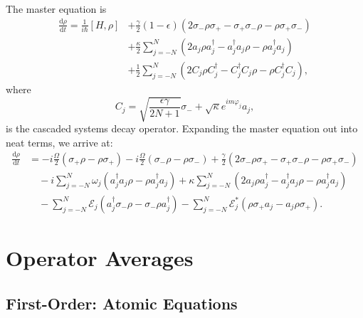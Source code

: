 \documentclass{article}
\newcommand{\ddt}[1][]{\frac{\mathrm{d} #1}{\mathrm{d}t}}
\begin{document}
The master equation is
\begin{align}
	\ddt[\rho] = \frac{1}{i \hbar} [H, \rho] &+ \frac{\gamma}{2} \left(1 - \epsilon\right) \left( 2 \sigma_{-} \rho \sigma_{+} - \sigma_{+} \sigma_{-} \rho - \rho \sigma_{+} \sigma_{-} \right) \nonumber \\
	&+ \frac{\kappa}{2} \sum_{j=-N}^{N} \left( 2 a_{j} \rho a^{\dagger}_{j} - a^{\dagger}_{j} a_{j} \rho - \rho a^{\dagger}_{j} a_{j} \right) \nonumber \\
	&+ \frac{1}{2} \sum_{j=-N}^{N} \left( 2 C_{j} \rho C^{\dagger}_{j} - C^{\dagger}_{j} C_{j} \rho - \rho C^{\dagger}_{j} C_{j} \right),
\end{align}
where
\begin{equation}
	C_{j} = \sqrt{\frac{\epsilon \gamma}{2N + 1}} \sigma_{-} + \sqrt{\kappa} e^{i m \varphi_{j}} a_{j},
\end{equation}
is the cascaded systems decay operator. Expanding the master equation out into neat terms, we arrive at:
\begin{align}
	\ddt[\rho] &= -i \frac{\Omega}{2} \left( \sigma_{+}\rho - \rho \sigma_{+} \right) - i \frac{\Omega}{2} \left( \sigma_{-} \rho - \rho \sigma_{-} \right) + \frac{\gamma}{2} \left( 2 \sigma_{-} \rho \sigma_{+} - \sigma_{+} \sigma_{-} \rho - \rho \sigma_{+} \sigma_{-} \right) \nonumber \\
	&\quad -i \sum_{j=-N}^{N} \omega_{j} \left( a^{\dagger}_{j} a_{j} \rho - \rho a^{\dagger}_{j} a_{j} \right) + \kappa \sum_{j=-N}^{N} \left( 2 a_{j} \rho a^{\dagger}_{j} - a^{\dagger}_{j} a_{j} \rho - \rho a^{\dagger}_{j} a_{j} \right) \nonumber \\
	&\quad - \sum_{j=-N}^{N} \mathcal{E}_{j} \left( a^{\dagger}_{j} \sigma_{-} \rho - \sigma_{-} \rho a^{\dagger}_{j} \right) - \sum_{j=-N}^{N} \mathcal{E}_{j}^{*} \left( \rho \sigma_{+} a_{j} - a_{j} \rho \sigma_{+} \right).
\end{align}

\section{Operator Averages}

\subsection{First-Order: Atomic Equations}
\end{document}
